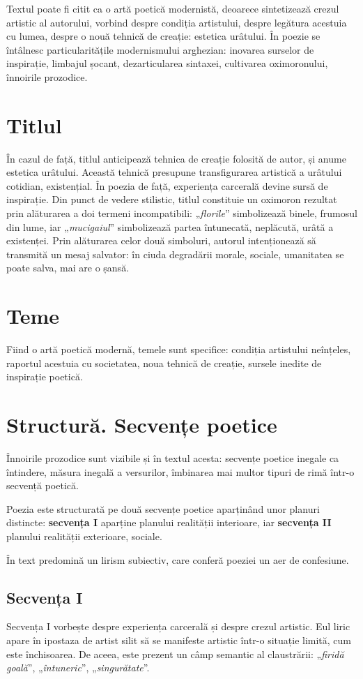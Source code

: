 \documentclass{article}
\newcommand{\qu}[1]{„\emph{#1}”}
\begin{document}
Textul poate fi citit ca o artă poetică modernistă, deoarece sintetizează crezul artistic al autorului, vorbind despre condiția artistului, despre legătura acestuia cu lumea, despre o nouă tehnică de creație: estetica urâtului. În poezie se întâlnesc particularitățile modernismului arghezian: inovarea surselor de inspirație, limbajul șocant, dezarticularea sintaxei, cultivarea oximoronului, înnoirile prozodice.

\section{Titlul}
În cazul de față, titlul anticipează tehnica de creație folosită de autor, și anume estetica urâtului. Această tehnică presupune transfigurarea artistică a urâtului cotidian, existențial. În poezia de față, experiența carcerală devine sursă de inspirație. Din punct de vedere stilistic, titlul constituie un oximoron rezultat prin alăturarea a doi termeni incompatibili: \qu{florile} simbolizează binele, frumosul din lume, iar \qu{mucigaiul} simbolizează partea întunecată, neplăcută, urâtă a existenței. Prin alăturarea celor două simboluri, autorul intenționează să transmită un mesaj salvator: în ciuda degradării morale, sociale, umanitatea se poate salva, mai are o șansă.

\section{Teme}
Fiind o artă poetică modernă, temele sunt specifice: condiția artistului neînțeles, raportul acestuia cu societatea, noua tehnică de creație, sursele inedite de inspirație poetică.

\section{Structură. Secvențe poetice}
Înnoirile prozodice sunt vizibile și în textul acesta: secvențe poetice inegale ca întindere, măsura inegală a versurilor, îmbinarea mai multor tipuri de rimă într-o secvență poetică.

Poezia este structurată pe două secvențe poetice aparținând unor planuri distincte: \textbf{secvența I} aparține planului realității interioare, iar \textbf{secvența II} planului realității exterioare, sociale.

În text predomină un lirism subiectiv, care conferă poeziei un aer de confesiune.

\subsection{Secvența I}
Secvența I vorbește despre experiența carcerală și despre crezul artistic. Eul liric apare în ipostaza de artist silit să se manifeste artistic într-o situație limită, cum este închisoarea. De aceea, este prezent un câmp semantic al claustrării: \qu{firidă goală}, \qu{întuneric}, \qu{singurătate}.
\end{document}
